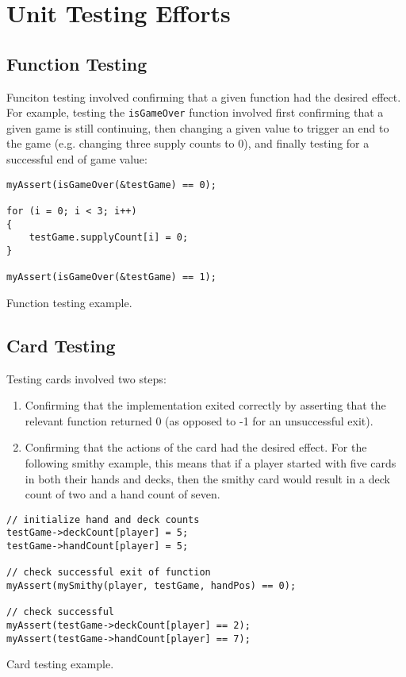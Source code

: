 \documentclass[11pt]{article}
\begin{document}
\section{Unit Testing Efforts}
\label{sec:unittestingefforts}

\subsection{Function Testing}
\label{sec:functiontesting}

Funciton testing involved confirming that a given function had the desired effect. For example, testing the \texttt{isGameOver} function involved first confirming that a given game is still continuing, then changing a given value to trigger an end to the game (e.g. changing three supply counts to 0), and finally testing for a successful end of game value:

\begin{listing}[htbp]
\begin{verbatim}
myAssert(isGameOver(&testGame) == 0);

for (i = 0; i < 3; i++)
{
    testGame.supplyCount[i] = 0;
}

myAssert(isGameOver(&testGame) == 1);
\end{verbatim}
\caption{Function testing example.}
\end{listing}

\subsection{Card Testing}
\label{sec:cardtesting}

Testing cards involved two steps:
\begin{enumerate}
\item Confirming that the implementation exited correctly by asserting that the relevant function returned 0 (as opposed to -1 for an unsuccessful exit).
\item Confirming that the actions of the card had the desired effect. For the following smithy example, this means that if a player started with five cards in both their hands and decks, then the smithy card would result in a deck count of two and a hand count of seven.
\end{enumerate}

\begin{listing}[htbp]
\begin{verbatim}
// initialize hand and deck counts
testGame->deckCount[player] = 5;
testGame->handCount[player] = 5;

// check successful exit of function
myAssert(mySmithy(player, testGame, handPos) == 0); 

// check successful 
myAssert(testGame->deckCount[player] == 2);
myAssert(testGame->handCount[player] == 7);
\end{verbatim}
\caption{Card testing example.}
\end{listing}
\end{document}
